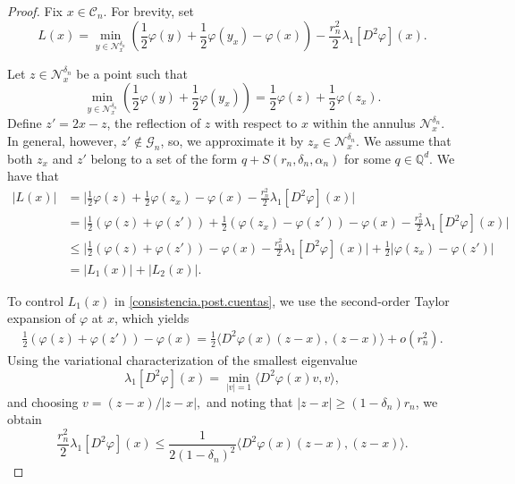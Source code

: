 \documentclass[11pt]{amsart}
\theoremstyle{definition}
\theoremstyle{remark}
\numberwithin{equation}{section}
\newcommand{\G}{\mathcal{G}}
\newcommand{\C}{{\mathcal C}}
\newcommand{\Nc}{{\mathcal N}}
\begin{document}
\begin{proof}
Fix $x\in \C_n$.
For brevity, set
\[
L(x)
= 
\min_{y\in \Nc_x^{\delta_n}}
\left(
\frac{1}{2} 
\varphi(y) 
+
\frac{1}{2}
\varphi(y_x) 
- 
\varphi(x)
\right)
-\frac{r_n^2}{2}
\lambda_1[D^2 \varphi](x)
.
\]

Let $z\in \Nc_x^{\delta_n}$ be a point such that
\[
\min_{y\in \Nc_x^{\delta_n}}
\left(
\frac{1}{2} 
\varphi(y) 
+
\frac{1}{2}
\varphi(y_x) 
\right)
=
\frac{1}{2} 
\varphi(z) 
+
\frac{1}{2}
\varphi(z_x) 
.
\]
Define $z'= 2x-z$, the reflection of $z$ with respect to $x$ within the annulus $\Nc_x^{\delta_n}$.
In general, however, $z'\notin\G_n$, so, we approximate it by $z_x\in \Nc_x^{\delta_n}$.
We assume that both $z_x$ and $z'$ belong to a set of the form $q+S(r_n,\delta_n,\alpha_n)$ for some $q\in \mathbb{Q}^d$.
We have that
\begin{align}
|L(x)|
& = 
\Big|
\frac{1}{2} 
\varphi(z) 
+
\frac{1}{2}
\varphi(z_x) 
- 
\varphi(x)
-\frac{r_n^2}{2}
\lambda_1[D^2 \varphi](x)
\Big|
\\
& =
\Big|
\frac{1}{2} 
\left(
\varphi(z) 
+ 
\varphi(z') 
\right)
+
\frac{1}{2}
\left(
\varphi(z_x) 
-
\varphi(z') 
\right)
- 
\varphi(x)
-\frac{r_n^2}{2}
\lambda_1[D^2 \varphi](x)
\Big| 
\\
& \leq 
\Big|
\frac{1}{2} 
\left(
\varphi(z) 
+ 
\varphi(z') 
\right)
- 
\varphi(x)
-\frac{r_n^2}{2}
\lambda_1[D^2 \varphi](x)
\Big| 
+ 
\frac{1}{2}
\Big|
\varphi(z_x) 
-
\varphi(z') 
\Big|
\\
\label{consistencia.post.cuentas}
&= |L_1(x)| + |L_2(x)|
.
\end{align}

To control $L_1(x)$ in \eqref{consistencia.post.cuentas}, we use the second-order Taylor expansion of $\varphi$ at $x$, which yields
\begin{align}
\label{consistencia.cota.Taylor}
\frac{1}{2} 
\left(
\varphi(z) 
+ 
\varphi(z') 
\right)
- 
\varphi(x)
= 
\frac{1}{2}
\langle
D^2 \varphi(x) (z-x), (z-x)
\rangle
+
o(r_n^2)
.
\end{align}
Using the variational characterization of the smallest eigenvalue 
\[
\lambda_1[D^2 \varphi](x)
= 
\min_{|v|=1}
\langle
D^2 \varphi(x) v, v
\rangle 
,
\]
and choosing $v=(z-x)/|z-x|,$ and noting that $|z-x|\geq (1-\delta_n)r_n$, we obtain
\begin{equation}
\label{consistencia.cota.autovalor}
\frac{r_n^2}{2}\lambda_1[D^2 \varphi](x)
\leq 
\frac{1}{2(1-\delta_n)^2}
\langle
D^2 \varphi(x) (z-x), (z-x)
\rangle
.
\end{equation}


\end{proof}
\end{document}
